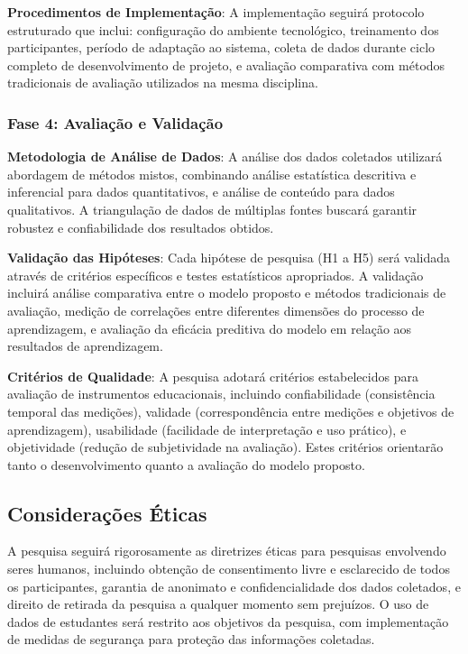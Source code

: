 \documentclass[12pt,a4paper]{article}
\begin{document}
\textbf{Procedimentos de Implementação}: A implementação seguirá protocolo estruturado que inclui: configuração do ambiente tecnológico, treinamento dos participantes, período de adaptação ao sistema, coleta de dados durante ciclo completo de desenvolvimento de projeto, e avaliação comparativa com métodos tradicionais de avaliação utilizados na mesma disciplina.

\subsubsection{Fase 4: Avaliação e Validação}

\textbf{Metodologia de Análise de Dados}: A análise dos dados coletados utilizará abordagem de métodos mistos, combinando análise estatística descritiva e inferencial para dados quantitativos, e análise de conteúdo para dados qualitativos. A triangulação de dados de múltiplas fontes buscará garantir robustez e confiabilidade dos resultados obtidos.

\textbf{Validação das Hipóteses}: Cada hipótese de pesquisa (H1 a H5) será validada através de critérios específicos e testes estatísticos apropriados. A validação incluirá análise comparativa entre o modelo proposto e métodos tradicionais de avaliação, medição de correlações entre diferentes dimensões do processo de aprendizagem, e avaliação da eficácia preditiva do modelo em relação aos resultados de aprendizagem.

\textbf{Critérios de Qualidade}: A pesquisa adotará critérios estabelecidos para avaliação de instrumentos educacionais, incluindo confiabilidade (consistência temporal das medições), validade (correspondência entre medições e objetivos de aprendizagem), usabilidade (facilidade de interpretação e uso prático), e objetividade (redução de subjetividade na avaliação). Estes critérios orientarão tanto o desenvolvimento quanto a avaliação do modelo proposto.

\subsection{Considerações Éticas}

A pesquisa seguirá rigorosamente as diretrizes éticas para pesquisas envolvendo
seres humanos, incluindo obtenção de consentimento livre e esclarecido de todos
os participantes, garantia de anonimato e confidencialidade dos dados
coletados, e direito de retirada da pesquisa a qualquer momento sem prejuízos.
O uso de dados de estudantes será restrito aos objetivos da pesquisa, com
implementação de medidas de segurança para proteção das informações coletadas.
\end{document}
